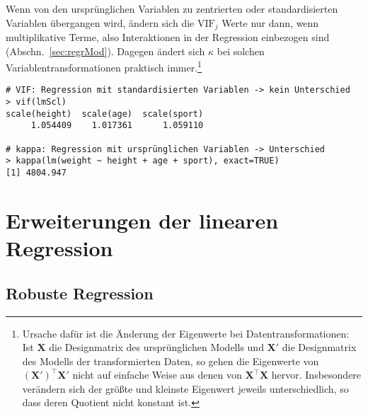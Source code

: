 Wenn von den ursprünglichen Variablen zu zentrierten oder standardisierten Variablen übergangen wird, ändern sich die $\text{VIF}_{j}$ Werte nur dann, wenn multiplikative Terme, also Interaktionen in der Regression einbezogen sind (Abschn.\ \ref{sec:regrMod}). Dagegen ändert sich $\kappa$ bei solchen Variablentransformationen praktisch immer.\footnote{Ursache dafür ist die Änderung der Eigenwerte bei Datentransformationen: Ist $\bm{X}$ die Designmatrix des ursprünglichen Modells und $\bm{X}'$ die Designmatrix des Modells der transformierten Daten, so gehen die Eigenwerte von $(\bm{X}')^{\top} \bm{X}'$ nicht auf einfache Weise aus denen von $\bm{X}^{\top} \bm{X}$ hervor. Insbesondere verändern sich der größte und kleinste Eigenwert jeweils unterschiedlich, so dass deren Quotient nicht konstant ist.}
\begin{lstlisting}
# VIF: Regression mit standardisierten Variablen -> kein Unterschied
> vif(lmScl)
scale(height)  scale(age)  scale(sport)
     1.054409    1.017361      1.059110

# kappa: Regression mit ursprünglichen Variablen -> Unterschied
> kappa(lm(weight ~ height + age + sport), exact=TRUE)
[1] 4804.947
\end{lstlisting}

\section{Erweiterungen der linearen Regression}
\label{sec:lmExtend}

\subsection{Robuste Regression}
\label{sec:lmRob}

